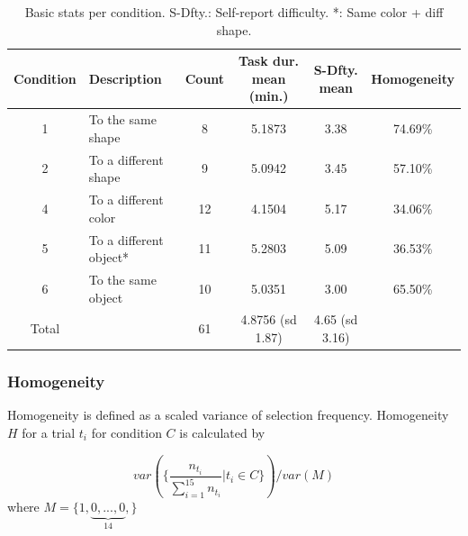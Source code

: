 \documentclass{article}
\begin{document}
\begin{table}[h!]
  \centering
  \begin{tabular}{c|l|c|c|c|c}
  Condition & Description & Count & Task dur. mean (min.) & S-Dfty. mean & Homogeneity \\
  \hline
  1        & To the same shape     & 8     & 5.1873 & 3.38 & 74.69\% \\
  2        & To a different shape  & 9     & 5.0942 & 3.45 & 57.10\% \\
  4        & To a different color  & 12    & 4.1504 & 5.17 & 34.06\% \\
  5        & To a different object* & 11   & 5.2803 & 5.09 & 36.53\% \\
  6        & To the same object    & 10    & 5.0351 & 3.00 & 65.50\% \\
  \hline
  Total    &                       & 61    & 4.8756 (sd 1.87) & 4.65 (sd 3.16) & \\
  \end{tabular}
  \caption{Basic stats per condition. S-Dfty.: Self-report difficulty.
  *: Same color + diff shape.}
  \label{table:conditions}
\end{table}

\subsubsection*{Homogeneity}

Homogeneity is defined as a scaled variance of selection frequency. Homogeneity $H$ for a trial $t_i$ for condition $C$ is calculated by

\[
var(\{\frac{n_{t_i}}{\sum_{i=1}^{15} n_{t_i}} | t_i \in C\})/var(M)
\]
where $M = \{1, \underbrace{0, ..., 0}_{14}, \}$
\end{document}
